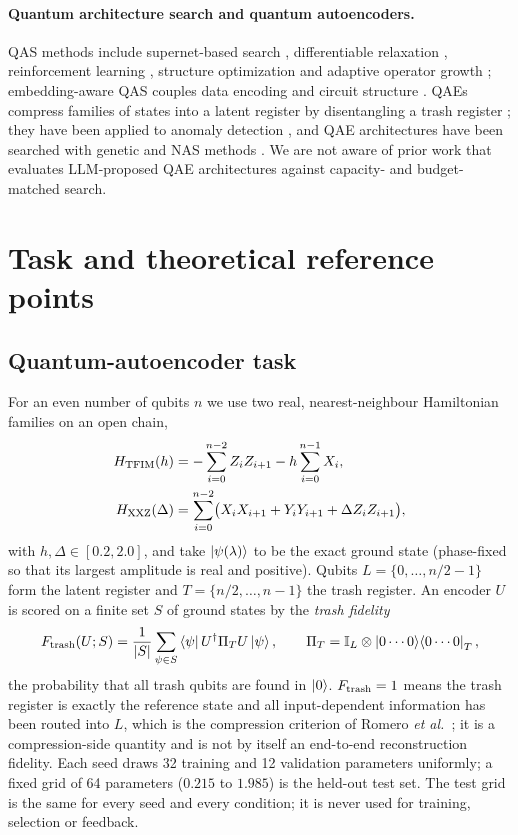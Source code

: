 \documentclass[11pt]{article}
\begin{document}
\paragraph{Quantum architecture search and quantum autoencoders.}
QAS methods include supernet-based search \cite{du2022}, differentiable relaxation
\cite{zhang2022dqas}, reinforcement learning \cite{kuo2021qasrl}, structure
optimization \cite{ostaszewski2021structure} and adaptive operator growth
\cite{grimsley2019adapt}; embedding-aware QAS couples data encoding and circuit
structure \cite{dai2026}.
QAEs compress families of states into a latent register by disentangling a trash
register \cite{romero2017}; they have been applied to anomaly detection
\cite{frehner2025,elalami2025}, and QAE architectures have been searched with genetic
and NAS methods \cite{agha2025,kulshrestha2025}. We are not aware of prior work that
evaluates LLM-proposed QAE architectures against capacity- and budget-matched search.

\section{Task and theoretical reference points}
\label{sec:task}

\subsection{Quantum-autoencoder task}

For an even number of qubits $n$ we use two real, nearest-neighbour Hamiltonian
families on an open chain,
\begin{align}
H_{\rm TFIM}(h) &= -\sum_{i=0}^{n-2} Z_iZ_{i+1} - h\sum_{i=0}^{n-1} X_i,\\
H_{\rm XXZ}(\Delta) &= \sum_{i=0}^{n-2}\bigl(X_iX_{i+1}+Y_iY_{i+1}+\Delta Z_iZ_{i+1}\bigr),
\end{align}
with $h,\Delta\in[0.2,2.0]$, and take $\ket{\psi(\lambda)}$ to be the exact ground
state (phase-fixed so that its largest amplitude is real and positive).
Qubits $L=\{0,\dots,n/2-1\}$ form the latent register and $T=\{n/2,\dots,n-1\}$
the trash register.
An encoder $U$ is scored on a finite set $S$ of ground states by the
\emph{trash fidelity}
\begin{equation}
F_{\rm trash}(U;S)=\frac{1}{|S|}\sum_{\psi\in S}\bra{\psi}U^\dagger\Pi_T U\ket{\psi},
\qquad \Pi_T = \mathbb{I}_L\otimes\ket{0\cdots0}\!\bra{0\cdots0}_T ,
\label{eq:ftrash}
\end{equation}
the probability that all trash qubits are found in $\ket 0$.
$F_{\rm trash}=1$ means the trash register is exactly the reference state and all
input-dependent information has been routed into $L$, which is the compression
criterion of Romero \emph{et al.}~\cite{romero2017}; it is a compression-side
quantity and is not by itself an end-to-end reconstruction fidelity.
Each seed draws 32 training and 12 validation parameters uniformly; a fixed grid of
64 parameters ($0.215$ to $1.985$) is the held-out test set.
The test grid is the same for every seed and every condition; it is never used for
training, selection or feedback.
\end{document}

